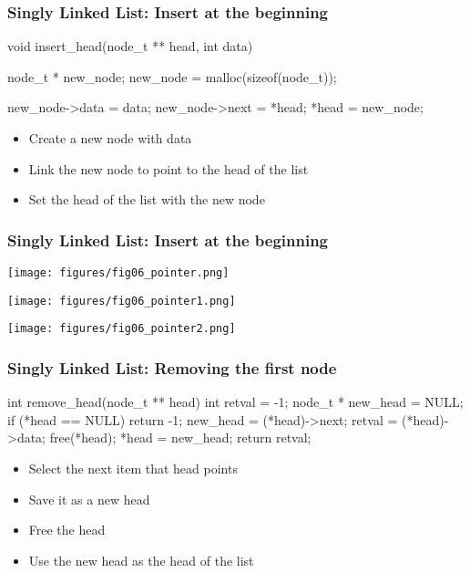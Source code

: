 \documentclass[newPxFont,sthlmFooter,nooffset]{beamer}
\begin{document}
\begin{frame}[t, fragile]
  \frametitle{Singly Linked List: Insert at the beginning}

\begin{ncodedef}
void insert_head(node_t ** head, int data) {
    node_t * new_node;
    new_node = malloc(sizeof(node_t));

    new_node->data = data;
    new_node->next = *head;
    *head = new_node;
}  
\end{ncodedef}
\bigskip
\begin{itemize}
\item Create a new node with data
\item Link the new node to point to the head of the list
\item Set the head of the list with the new node
\end{itemize}

\end{frame}


\begin{frame}[t]
  \frametitle{Singly Linked List: Insert at the beginning}
    \texttt{[image: figures/fig06\_pointer.png]}  

\bigskip
    \texttt{[image: figures/fig06\_pointer1.png]}  

\bigskip
    \texttt{[image: figures/fig06\_pointer2.png]}  
\end{frame}


\begin{frame}[t, fragile]
  \frametitle{Singly Linked List: Removing the first node}

\begin{ncodedef}
int remove_head(node_t ** head) {
    int retval = -1;
    node_t * new_head = NULL;
    if (*head == NULL) {
        return -1;
    }
    new_head = (*head)->next;
    retval = (*head)->data;
    free(*head);
    *head = new_head;
    return retval;
}  
\end{ncodedef}
\begin{itemize}
\item Select the next item that head points
\item Save it as a new head
\item Free the head
\item Use the new head as the head of the list
\end{itemize}
\end{frame}
\end{document}
